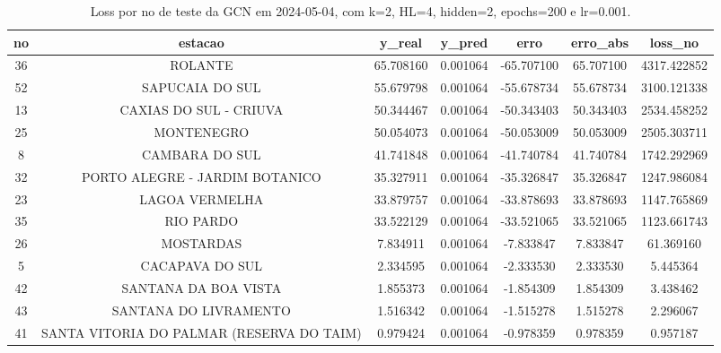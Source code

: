 \begin{table}[h]
\centering
\caption{Loss por no de teste da GCN em 2024-05-04, com k=2, HL=4, hidden=2, epochs=200 e lr=0.001.}
\label{tab:gcn_loss_k2_hl4_h2_e200_d20240504}
\begin{tabular}{ccccccc}
\toprule
no & estacao & y\_real & y\_pred & erro & erro\_abs & loss\_no \\
\midrule
36 & ROLANTE & 65.708160 & 0.001064 & -65.707100 & 65.707100 & 4317.422852 \\
52 & SAPUCAIA DO SUL & 55.679798 & 0.001064 & -55.678734 & 55.678734 & 3100.121338 \\
13 & CAXIAS DO SUL - CRIUVA & 50.344467 & 0.001064 & -50.343403 & 50.343403 & 2534.458252 \\
25 & MONTENEGRO & 50.054073 & 0.001064 & -50.053009 & 50.053009 & 2505.303711 \\
8 & CAMBARA DO SUL & 41.741848 & 0.001064 & -41.740784 & 41.740784 & 1742.292969 \\
32 & PORTO ALEGRE - JARDIM BOTANICO & 35.327911 & 0.001064 & -35.326847 & 35.326847 & 1247.986084 \\
23 & LAGOA VERMELHA & 33.879757 & 0.001064 & -33.878693 & 33.878693 & 1147.765869 \\
35 & RIO PARDO & 33.522129 & 0.001064 & -33.521065 & 33.521065 & 1123.661743 \\
26 & MOSTARDAS & 7.834911 & 0.001064 & -7.833847 & 7.833847 & 61.369160 \\
5 & CACAPAVA DO SUL & 2.334595 & 0.001064 & -2.333530 & 2.333530 & 5.445364 \\
42 & SANTANA DA BOA VISTA & 1.855373 & 0.001064 & -1.854309 & 1.854309 & 3.438462 \\
43 & SANTANA DO LIVRAMENTO & 1.516342 & 0.001064 & -1.515278 & 1.515278 & 2.296067 \\
41 & SANTA VITORIA DO PALMAR (RESERVA DO TAIM) & 0.979424 & 0.001064 & -0.978359 & 0.978359 & 0.957187 \\
\bottomrule
\end{tabular}
\end{table}
